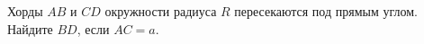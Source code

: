 \begin{ex}
	\begin{condition}
		Хорды \( AB  \) и \( CD  \) окружности радиуса \( R  \) пересекаются под прямым углом. Найдите \( BD \), если \( AC = a \).
	\end{condition}
\end{ex}